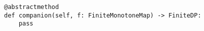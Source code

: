 \par\begin{minipage}{60ex}
\begin{verbatim}
@abstractmethod
def companion(self, f: FiniteMonotoneMap) -> FiniteDP:
    pass
\end{verbatim}
\end{minipage}\par